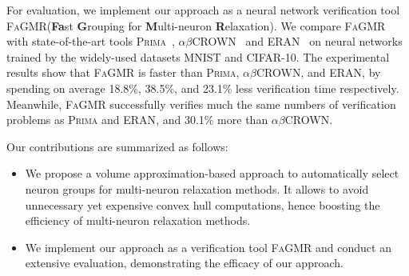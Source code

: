 \documentclass[runningheads]{llncs}
\newcommand{\ourtool}{\textsc{FaGMR}\xspace}
\newcommand{\prima}{\textsc{Prima}\xspace}
\newcommand{\mnist}{MNIST\xspace}
\newcommand{\cifar}{CIFAR-10\xspace}
\newcommand{\eran}{\textsc{ERAN}\xspace}
\newcommand{\abcrown}{\textsc{$\alpha$$\beta$CROWN}\xspace}
\begin{document}
For evaluation, we implement our approach as a neural network
verification tool \ourtool (\textbf{Fa}st \textbf{G}rouping for
\textbf{M}ulti-neuron \textbf{R}elaxation). We compare \ourtool with
state-of-the-art tools
\prima~\cite{DBLP:journals/pacmpl/MullerMSPV22},
\abcrown~\cite{DBLP:conf/iclr/XuZ0WJLH21} and \eran~\cite{ref_url4} on
neural networks trained by the widely-used datasets \mnist and \cifar.
The experimental results show that \ourtool is faster than \prima,
\abcrown, and \eran, by spending on average 18.8\%, 38.5\%, and 23.1\%
less verification time respectively. Meanwhile, \ourtool successfully
verifies much the same numbers of verification problems as \prima and
\eran, and 30.1\% more than \abcrown.

Our contributions are summarized as follows:
\begin{itemize}
  \item We propose a volume approximation-based approach to automatically select
    neuron groups for multi-neuron relaxation methods. It allows to
    avoid unnecessary yet expensive convex hull computations, hence
    boosting the efficiency of multi-neuron relaxation methods.
  \item We implement our approach as a verification tool \ourtool and
    conduct an extensive evaluation, demonstrating the efficacy of our
    approach.
\end{itemize}
\end{document}
